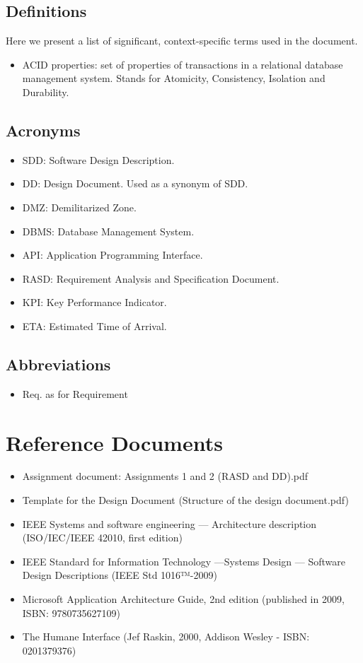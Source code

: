 \subsection{Definitions}
Here we present a list of significant, context-specific terms used in the document. 
\begin{itemize}
	\item ACID properties: set of properties of transactions in a relational database management system. Stands for Atomicity, Consistency, Isolation and Durability.
\end{itemize}
\subsection{Acronyms}
\begin{itemize}
	\item SDD: Software Design Description.
	\item DD: Design Document. Used as a synonym of SDD.
	\item DMZ: Demilitarized Zone.
	\item DBMS: Database Management System.
	\item API: Application Programming Interface.
	\item RASD: Requirement Analysis and Specification Document.
	\item KPI: Key Performance Indicator.
	\item ETA: Estimated Time of Arrival.
\end{itemize}
\subsection{Abbreviations}
\begin{itemize}
	\item Req. as for Requirement
\end{itemize}
\section{Reference Documents}
\begin{itemize}
	\item Assignment document: Assignments 1 and 2 (RASD and DD).pdf
	\item Template for the Design Document (Structure of the design document.pdf)
 	\item IEEE Systems and software engineering — Architecture description (ISO/IEC/IEEE 42010, first edition)
 	\item IEEE Standard for Information Technology —Systems Design — Software Design Descriptions (IEEE Std 1016™-2009)
 	\item Microsoft Application Architecture Guide, 2nd edition (published in 2009, ISBN: 9780735627109)
 	\item The Humane Interface (Jef Raskin, 2000, Addison Wesley - ISBN: 0201379376)
\end{itemize} 
 
